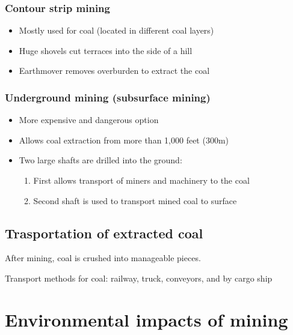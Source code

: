 \documentclass{article}
\begin{document}
\subsubsection{Contour strip mining}
\begin{itemize}
    \item Mostly used for coal (located in different coal layers)
    \item Huge shovels cut terraces into the side of a hill
    \item Earthmover removes overburden to extract the coal
\end{itemize}

\subsubsection{Underground mining (subsurface mining)}
\begin{itemize}
    \item More expensive and dangerous option
    \item Allows coal extraction from more than 1,000 feet (300m)
    \item Two large shafts are drilled into the ground:
    \begin{enumerate}
        \item First allows transport of miners and machinery to the coal
        \item Second shaft is used to transport mined coal to surface
    \end{enumerate}
\end{itemize}

\subsection{Trasportation of extracted coal}
After mining, coal is crushed into manageable pieces.

Transport methods for coal: railway, truck, conveyors, and by cargo ship

\section{Environmental impacts of mining}
\end{document}
